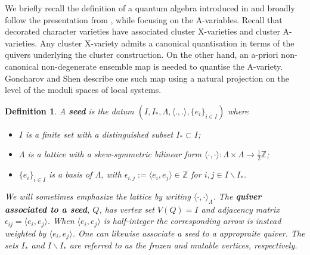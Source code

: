 \documentclass[a4paper]{article}
\numberwithin{equation}{section}
\newtheorem{definition}[counter]{Definition}
\newcommand{\1}{{\mathrm{1}\mkern-4mu{\mathchoice{}{}{\mskip-0.5mu}{\mskip-1mu}}\mathrm{l}}}
\newcommand{\ZZ}{\mathbb{Z}}
\begin{document}
We briefly recall the definition of a quantum algebra introduced in \cite{BZ05} and broadly follow the presentation from \cite{SS25}, while focusing on the A-variables. Recall that decorated character varieties have associated cluster X-varieties and cluster A-varieties.  Any cluster X-variety admits a canonical quantisation in terms of the quivers underlying the cluster construction. On the other hand, an a-priori non-canonical non-degenerate ensemble map is needed to quantise the A-variety.
Goncharov and Shen describe one such map using a natural projection on the level of the moduli spaces of local systems. 
\begin{definition}
    A \emph{\bf seed} is the datum $(I,I_{\ast}, \Lambda, \langle.,.\rangle,\{e_i\}_{i\in I})$ where
    \begin{itemize}
      \item $I$ is a finite set with a distinguished subset $I_{\ast} \subset I$;
      \item $\Lambda$ is a lattice with a skew-symmetric bilinear form $\langle \cdot,\cdot \rangle : \Lambda \times \Lambda \to \frac{1}{2} \ZZ$;
      \item $\{e_i\}_{i \in I}$ is a basis of $\Lambda$, with $\epsilon_{i,j} := \langle e_i,e_j\rangle \in \ZZ$ for $i,j \in I \backslash I_{\ast}$.
    \end{itemize}
    We will sometimes emphasize the lattice by writing $\langle\cdot,\cdot\rangle_\Lambda$.
    The \emph{\bf quiver associated to a seed}, $Q$, has vertex set $V(Q) = I$ and adjacency matrix $\epsilon_{ij} = \langle e_i,e_j\rangle$. When $\langle e_i,e_j\rangle$ is half-integer the corresponding arrow is instead weighted by $\langle e_i,e_j\rangle$.
 One can likewise associate a seed to a appropraite quiver. The sets $I_\ast$ and $I\backslash I_\ast$ are referred to as the frozen and mutable vertices, respectively.
 \end{definition}
\end{document}
